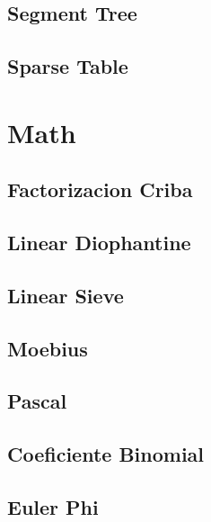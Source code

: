 \subsection{   Segment Tree}
\raggedbottom
\hrulefill
\subsection{   Sparse Table}
\raggedbottom
\hrulefill

\section{Math}
\subsection{	Factorizacion Criba}
\raggedbottom
\hrulefill
\subsection{	Linear Diophantine}
\raggedbottom
\hrulefill
\subsection{	Linear Sieve}
\raggedbottom
\hrulefill
\subsection{	Moebius}
\raggedbottom
\hrulefill
\subsection{	Pascal}
\raggedbottom
\hrulefill
\subsection{	Coeficiente Binomial}
\raggedbottom
\hrulefill
\subsection{	Euler Phi}
\raggedbottom
\hrulefill
